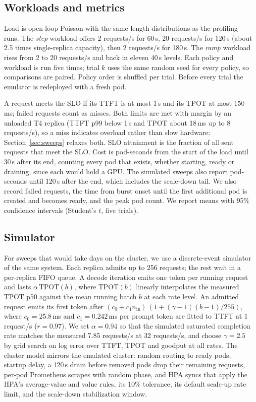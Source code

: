 \documentclass[10pt,conference]{IEEEtran}
\begin{document}
\subsection{Workloads and metrics}
Load is open-loop Poisson with the same length distributions as the profiling
runs. The \emph{step} workload offers 2 requests/s for 60\,s, 20 requests/s for
120\,s (about 2.5 times single-replica capacity), then 2 requests/s for 180\,s.
The \emph{ramp} workload rises from 2 to 20 requests/s and back in eleven 40\,s
levels. Each policy and workload is run five times; trial $k$ uses the same
random seed for every policy, so comparisons are paired. Policy order is
shuffled per trial. Before every trial the emulator is redeployed with a fresh
pod.

A request meets the SLO if its TTFT is at most 1\,s and its TPOT at most
150\,ms; failed requests count as misses. Both limits are met with margin by
an unloaded T4 replica (TTFT p99 below 1\,s and TPOT about 18\,ms up to
8 requests/s), so a miss indicates overload rather than slow hardware;
Section~\ref{sec:sweeps} relaxes both. SLO attainment is the fraction of all
sent requests that meet the SLO. Cost is pod-seconds from the start of the load
until 30\,s after its end, counting every pod that exists, whether starting,
ready or draining, since each would hold a GPU. The simulated sweeps also report
pod-seconds until 120\,s after the end, which includes the scale-down tail. We also record
failed requests, the time from burst onset until the first additional pod is
created and becomes ready, and the peak pod count. We report means with 95\%
confidence intervals (Student's $t$, five trials).

\subsection{Simulator}
For sweeps that would take days on the cluster, we use a discrete-event
simulator of the same system. Each replica admits up to 256 requests; the rest
wait in a per-replica FIFO queue. A decode iteration emits one token per running
request and lasts $\alpha\,\mathrm{TPOT}(b)$, where $\mathrm{TPOT}(b)$ linearly
interpolates the measured TPOT p50 against the mean running batch $b$ at each
rate level. An admitted request emits its first token after
$(c_0 + c_1 n_\text{in})\,(1 + (\gamma-1)(b-1)/255)$, where $c_0 = 25.8$\,ms and
$c_1 = 0.242$\,ms per prompt token are fitted to TTFT at 1 request/s
($r = 0.97$). We set $\alpha = 0.94$ so that the simulated saturated completion
rate matches the measured 7.85 requests/s at 32 requests/s, and choose
$\gamma = 2.5$ by grid search on log error over TTFT, TPOT and goodput at all
rates. The cluster model mirrors the emulated cluster: random routing to ready
pods, startup delay, a 120\,s drain before removed pods drop their remaining
requests, per-pod Prometheus scrapes with random phase, and HPA syncs that apply
the HPA's average-value and value rules, its 10\% tolerance, its default
scale-up rate limit, and the scale-down stabilization window.
\end{document}
